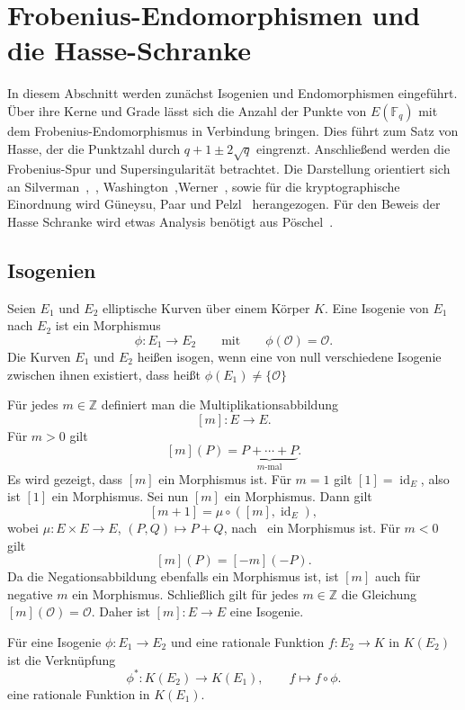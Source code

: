 \section{Frobenius-Endomorphismen und die Hasse-Schranke}
In diesem Abschnitt werden zunächst Isogenien und Endomorphismen eingeführt. Über ihre Kerne und Grade lässt sich die Anzahl der Punkte von $E(\mathbb F_q)$ mit dem Frobenius-Endomorphismus in Verbindung bringen. Dies führt zum Satz von Hasse, der die Punktzahl durch $q+1\pm2\sqrt q$ eingrenzt. Anschließend werden die Frobenius-Spur und Supersingularität betrachtet. Die Darstellung orientiert sich an Silverman~\cite[S.~67, 72~f., 79, 85 und 138]{silverman09},~\cite[S.~100]{silverman06}, Washington~\cite[S.~52, 98--102, 126--127 und 130--139]{washington08},Werner~\cite[S.~60--73]{werner02}, sowie für die kryptographische Einordnung wird Güneysu, Paar und Pelzl~\cite[S.~287]{guneysu24} herangezogen. Für den Beweis der Hasse Schranke wird etwas Analysis benötigt aus Pöschel~\cite[S.~115]{poeschel14}.
\subsection{Isogenien}
\begin{definition}[Isogenien]
    Seien $E_1$ und $E_2$ elliptische Kurven über
    einem Körper $K$. Eine Isogenie von $E_1$ nach $E_2$
    ist ein Morphismus
    \[
        \phi:E_1\to E_2
        \qquad\text{mit}\qquad
        \phi(\mathcal O)=\mathcal O.
    \]
    Die Kurven $E_1$ und $E_2$ heißen isogen, wenn
    eine von null verschiedene Isogenie zwischen
    ihnen existiert, dass heißt \(\phi(E_1)\neq\{\mathcal{O}\}\)
\end{definition}
\begin{beispiel}
    Für jedes $m\in\mathbb{Z}$ definiert man die Multiplikationsabbildung
    \[
        [m]: E\to E.
    \]
    Für $m>0$ gilt
    \[
        [m](P)=\underbrace{P+\cdots+P}_{m\text{-mal}}.
    \]
    Es wird gezeigt, dass $[m]$ ein Morphismus ist. Für $m=1$ gilt
    $[1]=\operatorname{id}_E$, also ist $[1]$ ein Morphismus. Sei nun
    $[m]$ ein Morphismus. Dann gilt
    \[
        [m+1]=\mu\circ([m],\operatorname{id}_E),
    \]
    wobei $\mu:E\times E\to E$, $(P,Q)\mapsto P+Q$, nach~\cite[III, Theorem 3.6, S.~64]{silverman09} ein Morphismus ist. Für $m<0$ gilt \[[m](P)=[-m](-P).\] Da die Negationsabbildung ebenfalls ein Morphismus ist, ist $[m]$ auch für negative $m$ ein Morphismus.
    Schließlich gilt für jedes $m\in\mathbb Z$ die Gleichung
    $[m](\mathcal O)=\mathcal O$. Daher ist $[m]:E\to E$ eine Isogenie.
\end{beispiel}
Für eine Isogenie \(\phi:E_1\to E_2\) und eine rationale Funktion $f:E_2\to K$ in $K(E_2)$ ist die Verknüpfung
\[
    \phi^*:K(E_2)\longrightarrow K(E_1),
    \qquad f\longmapsto f\circ\phi.
\]
eine rationale Funktion in $K(E_1)$.

